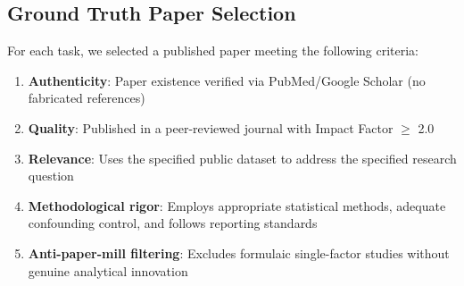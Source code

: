 \documentclass[12pt]{article}
\begin{document}
\subsection{Ground Truth Paper Selection}

For each task, we selected a published paper meeting the following criteria:

\begin{enumerate}
\item \textbf{Authenticity}: Paper existence verified via PubMed/Google Scholar (no fabricated references)
\item \textbf{Quality}: Published in a peer-reviewed journal with Impact Factor $\geq$ 2.0
\item \textbf{Relevance}: Uses the specified public dataset to address the specified research question
\item \textbf{Methodological rigor}: Employs appropriate statistical methods, adequate confounding control, and follows reporting standards
\item \textbf{Anti-paper-mill filtering}: Excludes formulaic single-factor studies without genuine analytical innovation
\end{enumerate}
\end{document}
